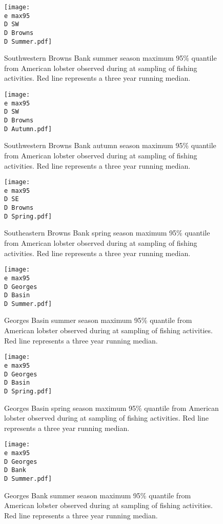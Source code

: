 \documentclass[11pt]{article}
\newcommand{\D}{.}
\newcommand{\e}{/backup/bio_data/bio.lobster/figures/} %
\begin{document}
\begin{figure}

    \texttt{[image: \\e max95\\D SW\\D Browns\\D Summer.pdf]}
    \caption{Southwestern Browns Bank summer season maximum 95\% quantile from American lobster observed during at sampling of fishing activities. Red line represents a three year running median.}

\end{figure}

\begin{figure}

    \texttt{[image: \\e max95\\D SW\\D Browns\\D Autumn.pdf]}
    \caption{Southwestern Browns Bank autumn season maximum 95\% quantile from American lobster observed during at sampling of fishing activities. Red line represents a three year running median.}

\end{figure}

\begin{figure}

    \texttt{[image: \\e max95\\D SE\\D Browns\\D Spring.pdf]}
    \caption{Southeastern Browns Bank spring season maximum 95\% quantile from American lobster observed during at sampling of fishing activities. Red line represents a three year running median.}

\end{figure}

\begin{figure}

    \texttt{[image: \\e max95\\D Georges\\D Basin\\D Summer.pdf]}
    \caption{Georges Basin summer season maximum 95\% quantile from American lobster observed during at sampling of fishing activities. Red line represents a three year running median.}

\end{figure}

\begin{figure}

    \texttt{[image: \\e max95\\D Georges\\D Basin\\D Spring.pdf]}
    \caption{Georges Basin spring season maximum 95\% quantile from American lobster observed during at sampling of fishing activities. Red line represents a three year running median.}

\end{figure}

\begin{figure}

    \texttt{[image: \\e max95\\D Georges\\D Bank\\D Summer.pdf]}
    \caption{Georges Bank summer season maximum 95\% quantile from American lobster observed during at sampling of fishing activities. Red line represents a three year running median.}

\end{figure}
\end{document}
